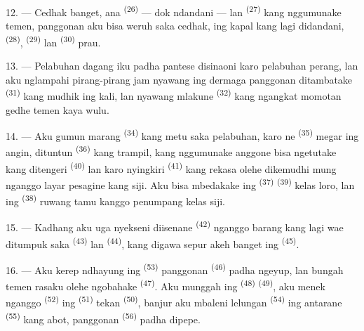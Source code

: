 12. --- Cedhak banget, ana  \textsuperscript{(26)} — dok
ndandani — lan  \textsuperscript{(27)} kang
nggumunake temen, panggonan aku bisa weruh saka cedhak, ing kapal kang
lagi didandani,  \textsuperscript{(28)},
 \textsuperscript{(29)} lan 
\textsuperscript{(30)} prau.

13. --- Pelabuhan dagang iku padha pantese disinaoni karo pelabuhan
perang, lan aku nglampahi pirang-pirang jam nyawang ing dermaga
panggonan ditambatake  \textsuperscript{(31)} kang
mudhik ing kali, lan nyawang mlakune 
\textsuperscript{(32)} kang ngangkat momotan gedhe temen kaya wulu.

\VUsaut{4.0mm}
\VUsaut{3.0mm}

14. --- Aku gumun marang 
\textsuperscript{(34)} kang metu saka pelabuhan, karo ne
\textsuperscript{(35)} megar ing angin, dituntun 
\textsuperscript{(36)} kang trampil, kang nggumunake anggone bisa
ngetutake  kang ditengeri 
\textsuperscript{(40)} lan  karo nyingkiri
 \textsuperscript{(41)} kang rekasa olehe dikemudhi
mung nganggo layar pesagine kang siji. Aku bisa mbedakake ing
 \textsuperscript{(37)} 
\textsuperscript{(39)} kelas loro, lan ing 
\textsuperscript{(38)} ruwang tamu kanggo penumpang kelas siji.

15. --- Kadhang aku uga nyekseni diisenane 
\textsuperscript{(42)} nganggo barang kang lagi wae ditumpuk saka
 \textsuperscript{(43)} lan 
\textsuperscript{(44)}, kang digawa sepur akeh banget ing  \textsuperscript{(45)}.

\VUsaut{3.0mm}
\VUsaut{3.0mm}

16. --- Aku kerep ndhayung ing  \textsuperscript{(53)}
panggonan  \textsuperscript{(46)} padha ngeyup, lan bungah
temen rasaku olehe ngobahake  \textsuperscript{(47)}. Aku
munggah ing  \textsuperscript{(48)} 
\textsuperscript{(49)}, aku menek nganggo 
\textsuperscript{(52)} ing  \textsuperscript{(51)}
tekan  \textsuperscript{(50)}, banjur aku mbaleni
lelungan  \textsuperscript{(54)} ing antarane
 \textsuperscript{(55)} kang abot, panggonan
 \textsuperscript{(56)} padha dipepe.

